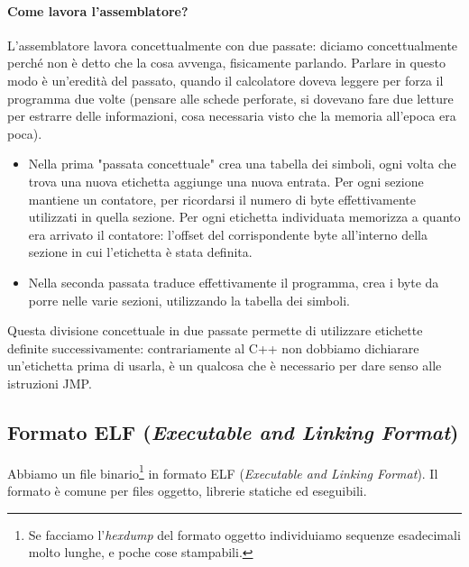 \paragraph{Come lavora l'assemblatore?} L'assemblatore lavora concettualmente con due passate: diciamo concettualmente perché non è detto che la cosa avvenga, fisicamente parlando. Parlare in questo modo è un'eredità del passato, quando il calcolatore doveva leggere per forza il programma due volte (pensare alle schede perforate, si dovevano fare due letture per estrarre delle informazioni, cosa necessaria visto che la memoria all'epoca era poca).
\begin{itemize}
	\item Nella prima "passata concettuale" crea una tabella dei simboli, ogni volta che trova una nuova etichetta aggiunge una nuova entrata. Per ogni sezione mantiene un contatore, per ricordarsi il numero di byte effettivamente utilizzati in quella sezione. Per ogni etichetta individuata memorizza a quanto era arrivato il contatore: l'offset del corrispondente byte all'interno della sezione in cui l'etichetta è stata definita.
	\item Nella seconda passata traduce effettivamente il programma, crea i byte da porre nelle varie sezioni, utilizzando la tabella dei simboli. 
\end{itemize}
Questa divisione concettuale in due passate permette di utilizzare etichette definite successivamente: contrariamente al C++ non dobbiamo dichiarare un'etichetta prima di usarla, è un qualcosa che è necessario per dare senso alle istruzioni JMP.

\subsection{Formato ELF (\emph{Executable and Linking Format})} Abbiamo un file binario\footnote{Se facciamo l'\emph{hexdump} del formato oggetto individuiamo sequenze esadecimali molto lunghe, e poche cose stampabili.} in formato ELF (\emph{Executable and Linking Format}). Il formato è comune per files oggetto, librerie statiche ed eseguibili.
